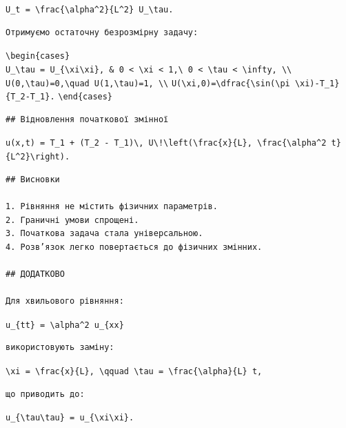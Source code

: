 \documentclass[
  ukrainian,
]{article}
\begin{document}
\texttt{U\_t\ =\ \textbackslash{}frac\{\textbackslash{}alpha\^{}2\}\{L\^{}2\}\ U\_\textbackslash{}tau.}

\begin{verbatim}
Отримуємо остаточну безрозмірну задачу:
\end{verbatim}

\texttt{\textbackslash{}begin\{cases\}}
\texttt{U\_\textbackslash{}tau\ =\ U\_\{\textbackslash{}xi\textbackslash{}xi\},\ \&\ 0\ \textless{}\ \textbackslash{}xi\ \textless{}\ 1,\textbackslash{}\ 0\ \textless{}\ \textbackslash{}tau\ \textless{}\ \textbackslash{}infty,\ \textbackslash{}\textbackslash{}}
\texttt{U(0,\textbackslash{}tau)=0,\textbackslash{}quad\ U(1,\textbackslash{}tau)=1,\ \textbackslash{}\textbackslash{}}
\texttt{U(\textbackslash{}xi,0)=\textbackslash{}dfrac\{\textbackslash{}sin(\textbackslash{}pi\ \textbackslash{}xi)-T\_1\}\{T\_2-T\_1\}.}
\texttt{\textbackslash{}end\{cases\}}

\begin{verbatim}
## Відновлення початкової змінної
\end{verbatim}

\texttt{u(x,t)\ =\ T\_1\ +\ (T\_2\ -\ T\_1)\textbackslash{},\ U\textbackslash{}!\textbackslash{}left(\textbackslash{}frac\{x\}\{L\},\ \textbackslash{}frac\{\textbackslash{}alpha\^{}2\ t\}\{L\^{}2\}\textbackslash{}right).}

\begin{verbatim}
## Висновки

1. Рівняння не містить фізичних параметрів.
2. Граничні умови спрощені.
3. Початкова задача стала універсальною.
4. Розв’язок легко повертається до фізичних змінних.

## ДОДАТКОВО

Для хвильового рівняння:
\end{verbatim}

\texttt{u\_\{tt\}\ =\ \textbackslash{}alpha\^{}2\ u\_\{xx\}}

\begin{verbatim}
використовують заміну:
\end{verbatim}

\texttt{\textbackslash{}xi\ =\ \textbackslash{}frac\{x\}\{L\},\ \textbackslash{}qquad\ \textbackslash{}tau\ =\ \textbackslash{}frac\{\textbackslash{}alpha\}\{L\}\ t,}

\begin{verbatim}
що приводить до:
\end{verbatim}

\texttt{u\_\{\textbackslash{}tau\textbackslash{}tau\}\ =\ u\_\{\textbackslash{}xi\textbackslash{}xi\}.}
\end{document}
